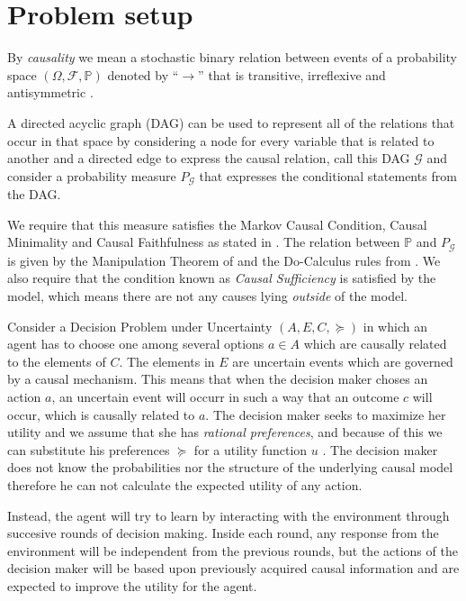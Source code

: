 \documentclass{article}
\begin{document}
\section{Problem setup}{\label{problem_setup}}
By \textit{causality} we mean a stochastic binary relation between events of a probability space $(\Omega, \mathcal{F}, \mathbb{P})$ denoted by $“\to”$ that is transitive, irreflexive and antisymmetric \cite{spirtes2000causation}. 

A directed acyclic graph (DAG) can be used to represent all of the relations that occur in that space by considering a node for every variable that is related to another and a directed edge to express the causal relation, call this DAG $\mathcal{G}$ and consider a probability measure $P_{\mathcal{G}}$ that expresses the conditional statements from the DAG. 

We require that this measure satisfies the Markov Causal Condition, Causal Minimality and Causal Faithfulness as stated in \cite{spirtes2000causation}. The relation between $\mathbb{P}$ and $P_{\mathcal{G}}$ is given by the Manipulation Theorem of \cite{spirtes2000causation} and the Do-Calculus rules from \cite{pearl2009causality}. We also require that the condition known as \textit{Causal Sufficiency} is satisfied by the model, which means there are not any causes lying \textit{outside} of the model. 

Consider a Decision Problem under Uncertainty $(A,E,C,\succeq)$ in which an agent has to choose one among several options $a \in A$ which are causally related to the elements of $C$. The elements in $E$ are uncertain events which are governed by a causal mechanism. This means that when the decision maker choses an action $a$, an uncertain event will occurr in such a way that an outcome $c$ will occur, which is causally related to $a$. The decision maker seeks to maximize her utility and we assume that she has \textit{rational preferences}, and because of this we can substitute his preferences $\succeq$ for a utility function $u$ \cite{gilboa2009decision}. The decision maker does not know the probabilities nor the structure of the underlying causal model therefore he can not calculate the expected utility of any action. 

Instead, the agent will try to learn by interacting with the environment through succesive rounds of decision making. Inside each round, any response from the environment will be independent from the previous rounds, but the actions of the decision maker will be based upon previously acquired causal information and are expected to improve the utility for the agent.
\end{document}
